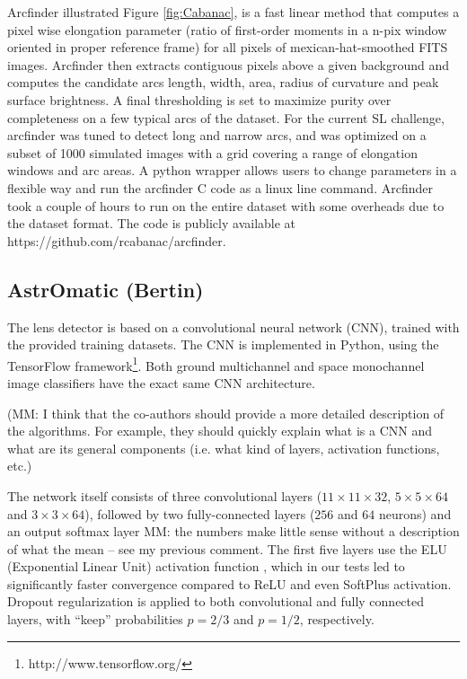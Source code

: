 \documentclass[useAMS,usenatbib]{mnras}
\begin{document}
Arcfinder \citep{2006astro.ph..6757A,2007A&A...461..813C,2012ApJ...749...38M} illustrated Figure \ref{fig:Cabanac}, is a fast linear method that computes a pixel wise elongation parameter (ratio of first-order moments in a n-pix window oriented in proper reference frame) for all pixels of mexican-hat-smoothed FITS images. Arcfinder then extracts contiguous pixels above a given background and computes the candidate arcs length, width, area, radius of curvature and peak surface brightness. A final thresholding is set to maximize purity over completeness on a few typical arcs of the dataset.
For the current SL challenge, arcfinder was tuned to detect long and narrow arcs, and was optimized on a subset of 1000 simulated images with a grid covering a range of elongation windows and arc areas.  A python wrapper allows users to change parameters in a flexible way and run the arcfinder C code as a linux line command. Arcfinder took a couple of hours to run on the entire dataset with some overheads due to the dataset format. The code is publicly available at https://github.com/rcabanac/arcfinder.

\subsection{AstrOmatic (Bertin)}

The lens detector is based on a convolutional neural network (CNN), trained with the provided training datasets. The CNN is implemented in Python, using the TensorFlow framework\footnote{http://www.tensorflow.org/}. Both ground multichannel and space monochannel image classifiers have the exact same CNN architecture.

{\color{red} (MM: I think that the co-authors should provide a more detailed description of the algorithms. For example, they should quickly explain what is a CNN and what are its general components (i.e. what kind of layers, activation functions, etc.)}

The network itself consists of three convolutional layers ($11\times 11\times 32$, $5\times 5 \times 64$ and $3\times 3\times 64$), followed by two fully-connected layers ($256$ and $64$ neurons) and an output softmax layer {\color{red} MM: the numbers make little sense without a description of what the mean -- see my previous comment}. The first five layers use the ELU (Exponential Linear Unit) activation function \citep{2015arXiv151107289C}, which in our tests led to significantly faster convergence compared to ReLU and even SoftPlus activation. Dropout regularization \citep{2012arXiv1207.0580H,JMLR:v15:srivastava14a} is applied to both convolutional and fully connected layers, with ``keep'' probabilities $p=2/3$ and $p=1/2$, respectively.
\end{document}
